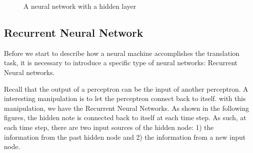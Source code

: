 \documentclass[final]{ua-thesis}
\numberwithin{equation}{section}
\begin{document}
\begin{figure}[h]
\caption{A neural network with a hidden layer}
\centering
{}
\end{figure}    

\subsection{Recurrent Neural Network}

Before we start to describe how a neural machine accomplishes the translation task, it is necessary to introduce a specific type of neural networks: Recurrent Neural networks. 

Recall that the output of a perceptron can be the input of another perceptron. A interesting manipulation is to let the perceptron connect back to itself. with this manipulation, we have the Recurrent Neural Networks. As shown in the following figures, the hidden note is connected back to itself at each time step. As such, at each time step, there are two input sources of the hidden node: 1) the information from the past hidden node and 2) the information from a new input node.       
\end{document}
